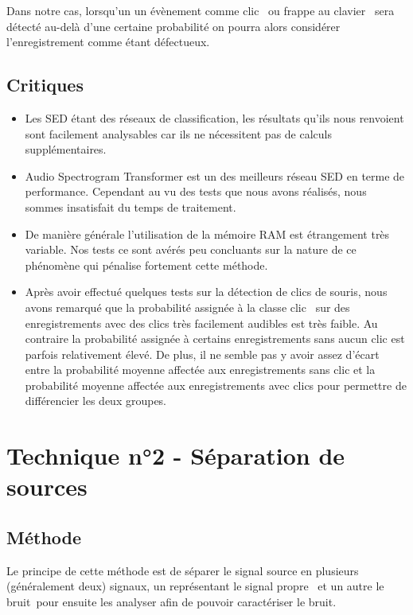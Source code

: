 \documentclass{article}
\begin{document}
Dans notre cas, lorsqu'un un évènement comme \og clic \fg\ ou \og frappe au clavier \fg\ sera détecté au-delà d'une certaine probabilité on pourra alors considérer l'enregistrement comme étant défectueux.

\subsection{Critiques}

\begin{itemize}
    \item Les SED étant des réseaux de classification, les résultats qu'ils nous renvoient sont facilement analysables car ils ne nécessitent pas de calculs supplémentaires.
    
    \item Audio Spectrogram Transformer est un des meilleurs réseau SED en terme de performance. Cependant au vu des tests que nous avons réalisés, nous sommes insatisfait du temps de traitement.
    
    \item De manière générale l’utilisation de la mémoire RAM est étrangement très variable. Nos tests ce sont avérés peu concluants sur la nature de ce phénomène qui pénalise fortement cette méthode.

    \item Après avoir effectué quelques tests sur la détection de clics de souris, nous avons remarqué que la probabilité assignée à la classe \og clic \fg\ sur des enregistrements avec des clics très facilement audibles est très faible.
    Au contraire la probabilité assignée à certains enregistrements sans aucun clic est parfois relativement élevé.
    De plus, il ne semble pas y avoir assez d’écart entre la probabilité moyenne affectée aux enregistrements sans clic et la probabilité moyenne affectée aux enregistrements avec clics pour permettre de différencier les deux groupes.
\end{itemize}


\section{Technique n°2 - Séparation de sources}

\subsection{Méthode}

Le principe de cette méthode est de séparer le signal source en plusieurs (généralement deux) signaux, un représentant le signal \og propre \fg\ et un autre le \og bruit\fg\ pour ensuite les analyser afin de pouvoir caractériser le bruit.
\end{document}

